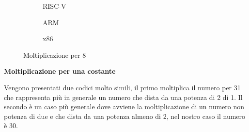 \documentclass[12pt,a4paper]{report}
\begin{document}
 \begin{figure}
     \begin{subfigure}[b]{0.3\textwidth}
         
          	
		\caption{RISC-V}
		\label{Code:Mul8RISC}
     \end{subfigure}
     \hfill
     \begin{subfigure}[b]{0.3\textwidth}
         
          	
		\caption{ARM}
		\label{Code:Mul8ARM}
     \end{subfigure}
     \hfill
     \begin{subfigure}[b]{0.3\textwidth}
         
          	
		\caption{x86}
		\label{Code:Mul8X86}
     \end{subfigure}
    
        \caption{Moltiplicazione per 8}
        
\end{figure}

\vspace{0.3 cm}

\textbf{Moltiplicazione per una costante}

Vengono presentati due codici molto simili, il primo moltiplica il numero per 31 che rappresenta più in generale un numero che dista da una potenza di 2 di 1. Il secondo è un caso più generale dove avviene la moltiplicazione di un numero non potenza di due e che dista da una potenza almeno di 2, nel nostro caso il numero è 30.

\vspace{0.2 cm }

\begin{figure}[h]
	\begin{subfigure}[b]{0.4\textwidth}
         
          	
		
     \end{subfigure}
     \hfill
     \begin{subfigure}[b]{0.4\textwidth}
         
          	
		
     \end{subfigure}
     
\end{figure}
\end{document}
